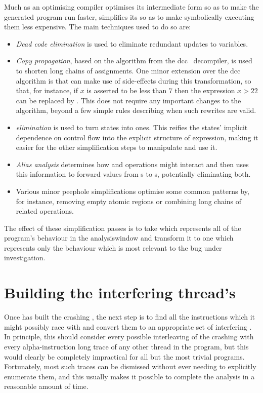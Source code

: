 Much as an optimising compiler optimises its intermediate form so as
to make the generated program run faster, {\technique} simplifies its
{\StateMachines} so as to make symbolically executing them less
expensive.  The main techniques used to do so are:
\begin{itemize}
\item \emph{Dead code elimination} is used to eliminate redundant
  updates to {\StateMachine} variables.
\item \emph{Copy propagation}, based on the algorithm from the
  dcc~\cite{Cifuentes1994} decompiler, is used to shorten long chains
  of assignments.  One minor extension over the dcc algorithm is that
  {\technique} can make use of  side-effects during this
  transformation, so that, for instance, if $x$ is asserted to be less
  than $7$ then the expression $x > 22$ can be replaced by \false.
  This does not require any important changes to the algorithm, beyond
  a few simple rules describing when such rewrites are valid.
\item \emph{{\stPhi} elimination} is used to turn {\stPhi} states into
   ones.  This reifies the {\stPhi} states' implicit
  dependence on {\StateMachine} control flow into the explicit
  structure of {\AStateMachine} expression, making it easier for the
  other simplification steps to manipulate and use it.
\item \emph{Alias analysis} determines how  and
   operations might interact and then uses this
  information to forward values from s to s,
  potentially eliminating both.
\item Various minor peephole simplifications optimise some common
  {\StateMachine} patterns by, for instance, removing empty atomic
  regions or combining long chains of related  operations.
\end{itemize}
The effect of these simplification passes is to take {\AStateMachine}
which represents all of the program's behaviour in the
\gls{analysiswindow} and transform it to one which represents only the
behaviour which is most relevant to the bug under investigation.

\section{Building the interfering thread's \StateMachines}
\label{sect:derive:write_side}

Once {\technique} has built the crashing {\StateMachine}, the next
step is to find all the instructions which it might possibly race with
and convert them to an appropriate set of interfering
{\StateMachines}.  In principle, this should consider every possible
interleaving of the crashing {\StateMachine} with every
\gls{alpha}-instruction long trace of any other thread in the program,
but this would clearly be completely impractical for all but the most
trivial programs.  Fortunately, most such traces can be dismissed
without ever needing to explicitly enumerate them, and this usually
makes it possible to complete the analysis in a reasonable amount of
time.

